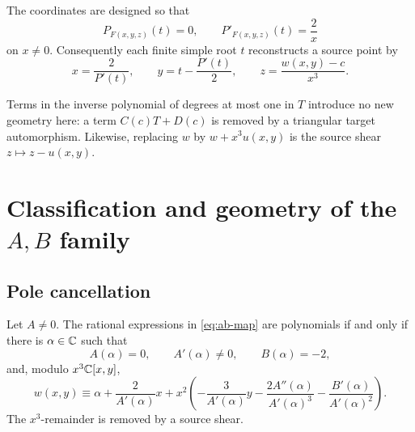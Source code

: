 \documentclass[11pt,reqno]{amsart}
\begin{document}
The coordinates are designed so that
\begin{equation}
\label{eq:root-identities}
P_{F(x,y,z)}(t)=0,\qquad
P'_{F(x,y,z)}(t)=\frac2x
\end{equation}
on \(x\ne0\).  Consequently each finite simple root \(t\) reconstructs a
source point by
\begin{equation}
\label{eq:reconstruction}
x=\frac2{P'(t)},\qquad
y=t-\frac{P'(t)}2,\qquad
z=\frac{w(x,y)-c}{x^3}.
\end{equation}

Terms in the inverse polynomial of degrees at most one in \(T\) introduce no
new geometry here: a term \(C(c)T+D(c)\) is removed by a triangular target
automorphism.  Likewise, replacing \(w\) by \(w+x^3u(x,y)\) is the source
shear \(z\mapsto z-u(x,y)\).

\section{Classification and geometry of the
\texorpdfstring{\(A,B\)}{A,B} family}
\label{sec:AB-family}

\subsection{Pole cancellation}

\begin{theorem}
\label{thm:pole-cancellation}
Let \(A\ne0\).  The rational expressions in \eqref{eq:ab-map} are
polynomials if and only if there is \(\alpha\in\mathbb C\) such that
\begin{equation}
\label{eq:admissibility}
A(\alpha)=0,\qquad A'(\alpha)\ne0,\qquad B(\alpha)=-2,
\end{equation}
and, modulo \(x^3\mathbb C[x,y]\),
\begin{equation}
\label{eq:w-jet}
w(x,y)\equiv
\alpha+\frac{2}{A'(\alpha)}x
+x^2\left(
-\frac{3}{A'(\alpha)}y
-\frac{2A''(\alpha)}{A'(\alpha)^3}
-\frac{B'(\alpha)}{A'(\alpha)^2}
\right).
\end{equation}
The \(x^3\)-remainder is removed by a source shear.
\end{theorem}
\end{document}
